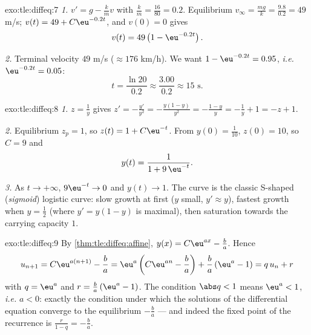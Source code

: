 \begin{solution}{exo:tle:diffeq:7}
\emph{1.} $v' = g - \frac{k}{m} v$ with $\frac km = \frac{16}{80} = 0.2$.
Equilibrium $v_\infty = \frac{mg}{k} = \frac{9.8}{0.2} = 49$ m/s;
$v(t) = 49 + C\eu^{-0.2t}$, and $v(0) = 0$ gives
\[
v(t) = 49\left(1 - \eu^{-0.2 t}\right).
\]

\emph{2.} Terminal velocity $49$ m/s ($\approx 176$ km/h). We want
$1 - \eu^{-0.2t} = 0.95$, \emph{i.e.} $\eu^{-0.2t} = 0.05$:
\[
t = \frac{\ln 20}{0.2} \approx \frac{3.00}{0.2} \approx 15 \text{ s}.
\]
\end{solution}

\begin{solution}{exo:tle:diffeq:8}
\emph{1.} $z = \frac1y$ gives $z' = -\frac{y'}{y^2}
= -\frac{y(1-y)}{y^2} = -\frac{1-y}{y} = -\frac1y + 1 = -z + 1$.

\emph{2.} Equilibrium $z_p = 1$, so $z(t) = 1 + C\eu^{-t}$. From
$y(0) = \frac{1}{10}$, $z(0) = 10$, so $C = 9$ and
\[
y(t) = \frac{1}{1 + 9\,\eu^{-t}} .
\]

\emph{3.} As $t \to +\infty$, $9\eu^{-t} \to 0$ and $y(t) \to 1$. The curve
is the classic S-shaped (\emph{sigmoid}) logistic curve: slow growth at
first ($y$ small, $y' \approx y$), fastest growth when $y = \frac12$
(where $y' = y(1-y)$ is maximal), then saturation towards the carrying
capacity $1$.
\end{solution}

\begin{solution}{exo:tle:diffeq:9}
By \cref{thm:tle:diffeq:affine}, $y(x) = C\eu^{ax} - \frac ba$. Hence
\[
u_{n+1} = C\eu^{a(n+1)} - \frac ba
= \eu^{a}\left(C\eu^{an} - \frac ba\right) + \frac ba\left(\eu^a - 1\right)
= q\,u_n + r
\]
with $q = \eu^{a}$ and $r = \frac{b}{a}\left(\eu^{a} - 1\right)$.
The condition $\abs q < 1$ means $\eu^a < 1$, \emph{i.e.} $a < 0$: exactly
the condition under which the solutions of the differential equation
converge to the equilibrium $-\frac ba$ --- and indeed the fixed point of
the recurrence is $\frac{r}{1 - q} = -\frac{b}{a}$.
\end{solution}
